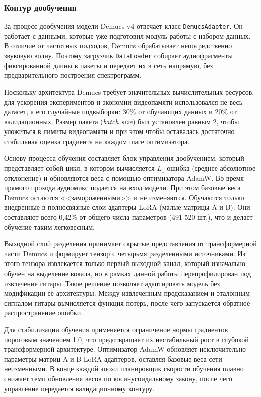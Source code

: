 \documentclass[14pt]{extarticle}
\begin{document}
\subsubsection{Контур дообучения}

За процесс дообучения модели Demucs v4 отвечает класс \texttt{DemucsAdapter}. Он работает с данными, которые уже подготовил модуль работы с набором данных. 
В отличие от частотных подходов, Demucs обрабатывает непосредственно звуковую волну. 
Поэтому загрузчик \texttt{DataLoader} собирает аудиофрагменты фиксированной длины в пакеты и передает их в сеть напрямую, без предварительного построения спектрограмм.

Поскольку архитектура Demucs требует значительных вычислительных ресурсов, для ускорения экспериментов и экономии видеопамяти использовался не весь датасет,
а его случайные подвыборки: 30\% от обучающих данных и 20\% от валидационных. 
Размер пакета (\textit{batch size}) был установлен равным 2, чтобы уложиться в лимиты видеопамяти и при этом чтобы оставалась достаточно стабильная оценка
градиента на каждом шаге оптимизатора.

Основу процесса обучения составляет блок управления дообучением, который представляет собой цикл, в котором вычисляется 
$L_1$-ошибка (среднее абсолютное отклонение) и обновляются веса
с помощью оптимизатора AdamW. 
Во время прямого прохода аудиомикс подается на вход модели. При этом базовые веса Demucs остаются <<замороженными>> и не изменяются. 
Обучаются только внедренные в полносвязные слои адаптеры LoRA (малые матрицы A и B).
Они составляют всего 0,42\% от общего числа параметров (491 520 шт.), что и делает обучение таким легковесным.

Выходной слой разделения принимает скрытые представления от трансформерной части Demucs и формирует тензор с четырьмя
разделенными источниками. Из этого тензора извлекается только первый выходной канал, который изначально обучен 
на выделение вокала, но в рамках данной работы перепрофилирован под извлечение гитары. 
Такое решение позволяет адаптировать модель без модификации её архитектуры. 
Между извлеченным предсказанием и эталонным сигналом гитары вычисляется функция потерь, 
после чего запускается обратное распространение ошибки.

Для стабилизации обучения применяется ограничение нормы градиентов пороговым значением 1.0, что предотвращает их 
нестабильный рост в глубокой трансформерной архитектуре. 
Оптимизатор AdamW обновляет исключительно параметры матриц A и B LoRA-адаптеров, оставляя базовые веса сети неизменными.
В конце каждой эпохи планировщик скорости обучения плавно снижает темп обновления весов по косинусоидальному закону,
после чего управление передается валидационному контуру.
\end{document}
